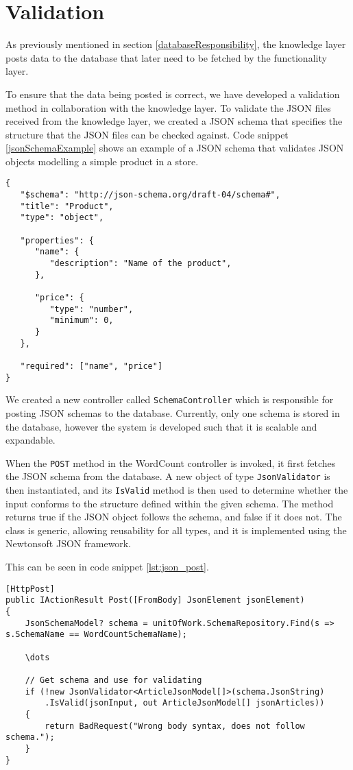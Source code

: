 \section{Validation}

As previously mentioned in section \ref{databaseResponsibility}, the knowledge layer posts data to the database that later need to be fetched by the functionality layer.

To ensure that the data being posted is correct, we have developed a validation method in collaboration with the knowledge layer.
To validate the JSON files received from the knowledge layer, we created a JSON schema that specifies the structure that the JSON files can be checked against. 
Code snippet \ref{jsonSchemaExample} shows an example of a JSON schema that validates JSON objects modelling a simple product in a store. 

\begin{lstlisting}[language=CSharp, caption={An example of a basic JSON schema.}, label={lst:jsonSchemaExample}]
{
   "$schema": "http://json-schema.org/draft-04/schema#",
   "title": "Product",
   "type": "object",
	
   "properties": {		
      "name": {
         "description": "Name of the product",
      },
		
      "price": {
         "type": "number",
         "minimum": 0,
      }
   },
	
   "required": ["name", "price"]
}
\end{lstlisting}

We created a new controller called \texttt{SchemaController} which is responsible for posting JSON schemas to the database. 
Currently, only one schema is stored in the database, however the system is developed such that it is scalable and expandable.

When the \texttt{POST} method in the WordCount controller is invoked, it first fetches the JSON schema from the database.
A new object of type \texttt{JsonValidator} is then instantiated, and its \texttt{IsValid} method is then used to determine whether the input conforms to the structure defined within the given schema. 
The method returns true if the JSON object follows the schema, and false if it does not.
The class is generic, allowing reusability for all types, and it is implemented using the Newtonsoft JSON framework. 

This can be seen in code snippet \ref{lst:json_post}.

\begin{lstlisting}[language=CSharp, caption={Snippet from the \texttt{POST} method showing validation of the input JSON.}, label={lst:json_post}]
[HttpPost]
public IActionResult Post([FromBody] JsonElement jsonElement)
{
	JsonSchemaModel? schema = unitOfWork.SchemaRepository.Find(s => s.SchemaName == WordCountSchemaName);
	
	\dots

	// Get schema and use for validating
	if (!new JsonValidator<ArticleJsonModel[]>(schema.JsonString)
		.IsValid(jsonInput, out ArticleJsonModel[] jsonArticles))
	{
		return BadRequest("Wrong body syntax, does not follow schema.");
	}
}
\end{lstlisting}

